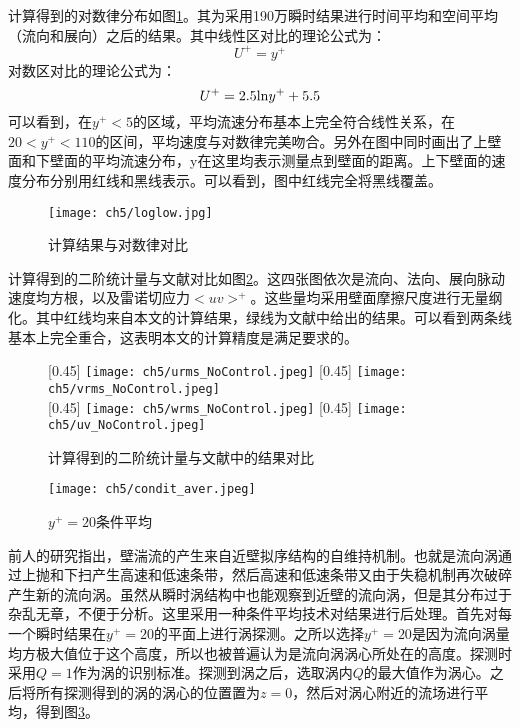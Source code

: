 计算得到的对数律分布如图\ref{f:loglow}。其为采用190万瞬时结果进行时间平均和空间平均（流向和展向）之后的结果。其中线性区对比的理论公式为：
\begin{equation}\label{e:linear_region}
  U^+=y^+
\end{equation}
对数区对比的理论公式为：
\begin{equation}\label{e:loglaw}
  U^+=2.5{\rm ln}y^++5.5
\end{equation}
可以看到，在$y^+<5$的区域，平均流速分布基本上完全符合线性关系，在$20<y^+<110$的区间，平均速度与对数律完美吻合。另外在图中同时画出了上壁面和下壁面的平均流速分布，y在这里均表示测量点到壁面的距离。上下壁面的速度分布分别用红线和黑线表示。可以看到，图中红线完全将黑线覆盖。
\begin{figure}[htb]
  \centering
  \texttt{[image: ch5/loglow.jpg]}
  \caption{计算结果与对数律对比}\label{f:loglow}
\end{figure}

计算得到的二阶统计量与文献对比如图\ref{f:2orderaver}。这四张图依次是流向、法向、展向脉动速度均方根，以及雷诺切应力$<uv>^+$。这些量均采用壁面摩擦尺度进行无量纲化。其中红线均来自本文的计算结果，绿线为文献\cite{Kim1987}中给出的结果。可以看到两条线基本上完全重合，这表明本文的计算精度是满足要求的。
\begin{figure}[htb]
  \centering
  [0.45\textwidth] %
    {\texttt{[image: ch5/urms\_NoControl.jpeg]}}%
  [0.45\textwidth]
    {\texttt{[image: ch5/vrms\_NoControl.jpeg]}}%
  \\\bigskip
  [0.45\textwidth] %
    {\texttt{[image: ch5/wrms\_NoControl.jpeg]}}%
  [0.45\textwidth]
    {\texttt{[image: ch5/uv\_NoControl.jpeg]}}%
  \caption{计算得到的二阶统计量与文献中的结果对比}\label{f:2orderaver}
\end{figure}
\begin{figure}[htb]
  \centering
  \texttt{[image: ch5/condit\_aver.jpeg]}
  \caption{$y^+=20$条件平均}\label{f:base_condition_average}
\end{figure}

前人的研究\cite{Hamilton1995}指出，壁湍流的产生来自近壁拟序结构的自维持机制。也就是流向涡通过上抛和下扫产生高速和低速条带，然后高速和低速条带又由于失稳机制再次破碎产生新的流向涡。虽然从瞬时涡结构中也能观察到近壁的流向涡，但是其分布过于杂乱无章，不便于分析。这里采用一种条件平均技术对结果进行后处理。首先对每一个瞬时结果在$y^+=20$的平面上进行涡探测。之所以选择$y^+=20$是因为流向涡量均方极大值位于这个高度\cite{Jeong1997}，所以也被普遍认为是流向涡涡心所处在的高度。探测时采用$Q=1$作为涡的识别标准。探测到涡之后，选取涡内$Q$的最大值作为涡心。之后将所有探测得到的涡的涡心的位置置为$z=0$，然后对涡心附近的流场进行平均，得到图\ref{f:base_condition_average}。



